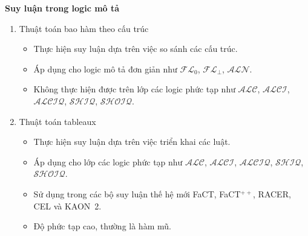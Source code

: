 \documentclass[notheorems,xcolor=dvipsnames]{beamer}
\newcommand{\FLzero}	{$\mathcal{FL}_0$\xspace}
\newcommand{\FLbot}		{$\mathcal{FL}_\bot$\xspace}
\newcommand{\ALC}		{$\mathcal{ALC}$\xspace}
\newcommand{\ALN}		{$\mathcal{ALN}$\xspace}
\newcommand{\ALCI}		{$\mathcal{ALCI}$\xspace}
\newcommand{\ALCIQ}		{$\mathcal{ALCIQ}$\xspace}
\newcommand{\SHIQ}		{$\mathcal{SHIQ}$\xspace}
\newcommand{\SHOIQ}		{$\mathcal{SHOIQ}$\xspace}
\begin{document}
\begin{frame}{\bf Suy luận trong logic mô tả}
	\begin{enumerate}
		\setlength{\itemsep}{2.0ex}
		\item Thuật toán bao hàm theo cấu trúc
		\begin{itemize}
			\setlength{\itemsep}{1.0ex}
			\item Thực hiện suy luận dựa trên việc so sánh các cấu trúc.
			\item Áp dụng cho logic mô tả đơn giản như \FLzero, \FLbot, \ALN.
			\item Không thực hiện được trên lớp các logic phức tạp như \ALC, \ALCI, \ALCIQ, \SHIQ, \SHOIQ.
		\end{itemize}
		\item Thuật toán tableaux
		\begin{itemize}
			\setlength{\itemsep}{1.0ex}
			\item Thực hiện suy luận dựa trên việc triển khai các luật.
			\item Áp dụng cho lớp các logic phức tạp như \ALC, \ALCI, \ALCIQ, \SHIQ, \SHOIQ.
			\item Sử dụng trong các bộ suy luận thế hệ mới FaCT, FaCT$^{++}$, RACER, CEL và KAON~2.
			\item Độ phức tạp cao, thường là hàm mũ.
		\end{itemize}		
	\end{enumerate}
\end{frame}
\end{document}
